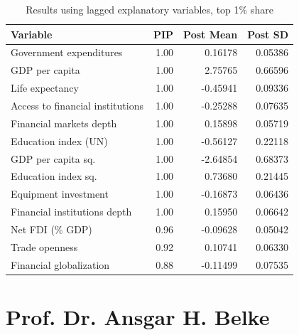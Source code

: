     \begin{table}[ht!]    
      \caption{Results using lagged explanatory variables, top 1\% share}\label{chA:tab6}
      \centering
      \footnotesize
      \begin{tabular}{lrrr}
        \toprule
      Variable & PIP & Post Mean & Post SD \\
        \midrule
        Government expenditures & 1.00 & 0.16178 & 0.05386 \\
        GDP per capita & 1.00 & 2.75765 & 0.66596 \\
        Life expectancy & 1.00 & -0.45941 & 0.09336 \\ 
        Access to financial institutions & 1.00 & -0.25288 & 0.07635 \\
        Financial markets depth & 1.00 & 0.15898 & 0.05719 \\ 
        Education index (UN) & 1.00 & -0.56127 & 0.22118 \\
        GDP per capita sq. & 1.00 & -2.64854 & 0.68373 \\ 
        Education index sq. & 1.00 & 0.73680 & 0.21445 \\
        Equipment investment & 1.00 & -0.16873 & 0.06436 \\ 
        Financial institutions depth & 1.00 & 0.15950 & 0.06642 \\
        Net FDI (\% GDP) & 0.96 & -0.09628 & 0.05042 \\ 
        Trade openness & 0.92 & 0.10741 & 0.06330 \\ 
        Financial globalization & 0.88 & -0.11499 & 0.07535 \\
        \bottomrule
      \end{tabular}
      \end{table}

\clearpage
\section{Prof. Dr. Ansgar H. Belke}


